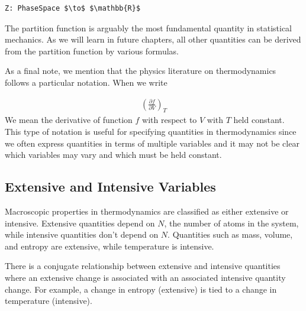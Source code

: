 \documentclass[book.tex]{subfiles}
\begin{document}
\begin{lstlisting}
Z: PhaseSpace $\to$ $\mathbb{R}$
\end{lstlisting}

The partition function is arguably the most fundamental quantity in statistical mechanics. As we will learn in future chapters, all other quantities can be derived from the partition function by various formulas.

As a final note, we mention that the physics literature on thermodynamics follows a particular notation. When we write

\begin{align}
\left ( \frac{\partial f}{\partial V} \right )_T
\end{align}
We mean the derivative of function $f$ with respect to $V$ with $T$ held constant. This type of notation is useful for specifying quantities in thermodynamics since we often express quantities in terms of multiple variables and it may not be clear which variables may vary and which must be held constant.


\subsection{Extensive and Intensive Variables}

Macroscopic properties in thermodynamics are classified as either extensive or intensive. Extensive quantities depend on $N$, the number of atoms in the system, while intensive quantities don't depend on $N$. Quantities such as mass, volume, and entropy are extensive, while temperature is intensive.

There is a conjugate relationship between extensive and intensive quantities where an extensive change is associated with an associated intensive quantity change. For example, a change in entropy (extensive) is tied to a change in temperature (intensive). 

\end{document}
